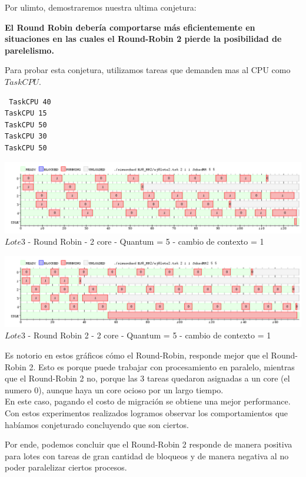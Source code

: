  \indent Por ulimto, demostraremos nuestra ultima conjetura: 
 
  \begin{center}
   \textbf{El Round Robin debería comportarse más eficientemente en situaciones en
   las cuales el Round-Robin 2 pierde la posibilidad de parelelismo.}
  \end{center}
  
  \indent Para probar esta conjetura, utilizamos tareas que demanden mas al CPU como $TaskCPU$.\\
  
\begin{verbatim}
 TaskCPU 40
TaskCPU 15
TaskCPU 50
TaskCPU 30
TaskCPU 50
\end{verbatim}

\begin{center}
    	\includegraphics[width=450pt]{./EJ8_RR2/dif10corerr.png}
	{$Lote 3$ - Round Robin - 2 core - Quantum = 5 - cambio de contexto = 1}	
 \end{center}
 
 \begin{center}
    	\includegraphics[width=450pt]{./EJ8_RR2/dif10corerr2.png}
	{$Lote 3$ - Round Robin 2 - 2 core - Quantum = 5 - cambio de contexto = 1}	
 \end{center}

 \indent Es notorio en estos gráficos cómo el Round-Robin, responde mejor que el Round-Robin 2. 
 Esto es porque puede trabajar con procesamiento en paralelo, mientras que el Round-Robin 2 no, 
 porque las 3 tareas quedaron asignadas a un core (el numero 0), aunque haya un core ocioso por un largo tiempo.\\
 En este caso, pagando el costo de migración se obtiene una mejor performance.\\

\indent Con estos experimentos realizados logramos observar los comportamientos que habíamos conjeturado concluyendo que son
ciertos. 

\indent Por ende, podemos concluir que el Round-Robin 2 responde de manera positiva para lotes con tareas de gran cantidad de bloqueos
y de manera negativa al no poder paralelizar ciertos procesos.\\
  
